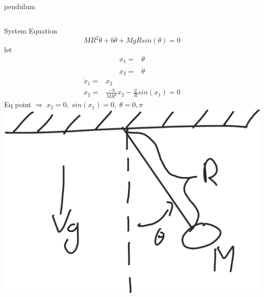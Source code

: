 \documentclass{beamer}
\begin{document}
\begin{frame}{pendulum}
    \begin{columns}[T]
    System Equation
    $$MR^2 \ddot{\theta} + b\dot{\theta} + MgRsin(\theta)=0$$
    let
    \vspace*{-0.5cm}
    \begin{align*}
        x_1 =& \theta\\
        x_2 =& \dot{\theta}
    \end{align*}
    \vspace*{-1cm}
    \begin{align*}
        \dot{x}_1 =& x_2\\
        \dot{x}_2 =& \frac{-b}{MR^2}x_2-\frac{g}{R}sin(x_1)=0
    \end{align*}
    Eq point $\Rightarrow \; x_2=0,\; sin(x_1)=0,\; \theta=0,\pi$
        \includegraphics[width=\textwidth]{fig/pendulum.png}   
    \end{columns}
\end{frame}
\end{document}
